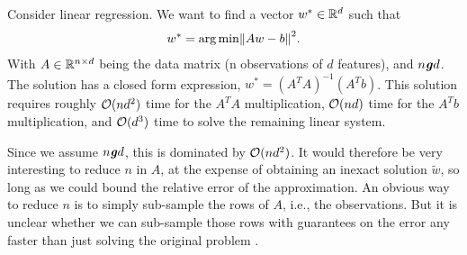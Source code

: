 Consider linear regression. We want to find a vector $w^* \in \mathbb R^d$ such that 
\begin{align}
    w^* =  \argmin \norm{Aw - b}^2.
\end{align}
With $A \in \mathbb R^{n \times d}$ being the data matrix (n observations of $d$ features), 
and $n \ggreater d$.
The solution has a closed form expression, 
$w^* = (A^TA)^{-1}(A^Tb)$. 
This solution requires roughly
$\mathcal{O}(nd^2)$ time for the $A^TA$ multiplication,
$\mathcal{O}(nd)$ time for the $A^Tb$ multiplication,
and $\mathcal{O}(d^3)$ time to solve the remaining linear system. 

Since we assume $n \ggreater d$, this is dominated by $\mathcal{O}(nd^2)$.
It would therefore be very interesting to reduce $n$ in $A$,
at the expense of obtaining an inexact solution $\tilde{w}$,
so long as we could bound the relative error of the approximation.
An obvious way to reduce $n$ is to simply sub-sample the rows of $A$, i.e., 
the observations.
But it is unclear whether we can sub-sample those rows with guarantees on the error 
any faster than just solving the original problem \cite{sarlos2006improved}.
